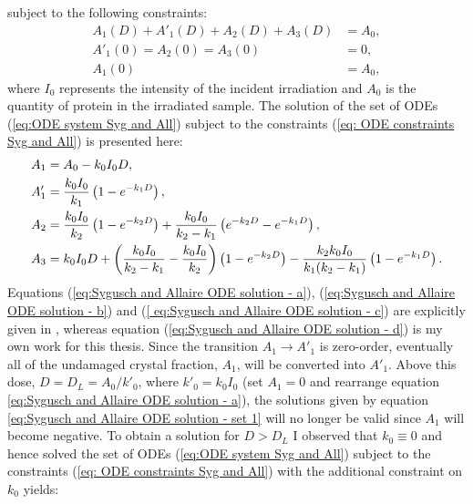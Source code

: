 subject to the following constraints:
\begin{subequations}
\begin{align}
A_1(D) + A'_1(D) + A_2(D) + A_3(D) &= A_0, \\
A'_1(0) = A_2(0) = A_3(0)          &= 0,   \\
A_1(0)                             &= A_0,
\end{align}
\label{eq: ODE constraints Syg and All}
\end{subequations}
where $I_0$ represents the intensity of the incident irradiation and $A_0$ is the quantity of protein in the irradiated sample.
\newline
The solution of the set of ODEs (\ref{eq:ODE system Syg and All}) subject to the constraints (\ref{eq: ODE constraints Syg and All}) is presented here:
\begin{subequations}
\begin{align}
A_1  &= A_0 - k_0 I_0 D, \label{eq:Sygusch and Allaire ODE solution - a}\\
A'_1 &= \frac{k_0 I_0}{k_1} \left( 1 - e^{-k_1 D}\right), \label{eq:Sygusch and Allaire ODE solution - b}\\
A_2  &= \frac{k_0 I_0}{k_2} \left( 1 - e^{-k_2 D}\right) + \frac{k_0 I_0}{k_2 - k_1} \left(e^{-k_2 D} - e^{-k_1 D}\right), \label{
eq:Sygusch and Allaire ODE solution - c}\\
A_3  &= k_0 I_0 D + \left(\frac{k_0 I_0}{k_2 - k_1} - \frac{k_0 I_0}{k_2}\right)\left( 1 - e^{-k_2 D}\right) - \frac{k_2 k_0 I_0}{k_1(k_2 - k_1)}\left(1 - e^{-k_1 D} \right) \label{eq:Sygusch and Allaire ODE solution - d}.
\end{align}
\label{eq:Sygusch and Allaire ODE solution - set 1}
\end{subequations}
Equations (\ref{eq:Sygusch and Allaire ODE solution - a}), (\ref{eq:Sygusch and Allaire ODE solution - b}) and (\ref{
eq:Sygusch and Allaire ODE solution - c}) are explicitly given in \cite{sygusch1988}, whereas equation (\ref{eq:Sygusch and Allaire ODE solution - d}) is my own work for this thesis.
Since the transition $A_1 \rightarrow A'_1$ is zero-order, eventually all of the undamaged crystal fraction, $A_1$, will be converted into $A'_1$.
Above this dose, $D = D_L = A_0/k'_0$, where $k'_0 = k_0 I_0$ (set $A_1 = 0$ and rearrange equation \ref{eq:Sygusch and Allaire ODE solution - a}), the solutions given by equation \ref{eq:Sygusch and Allaire ODE solution - set 1} will no longer be valid since $A_1$ will become negative.
To obtain a solution for $D > D_L$ I observed that $k_0 \equiv 0$ and hence solved the set of ODEs (\ref{eq:ODE system Syg and All}) subject to the constraints (\ref{eq: ODE constraints Syg and All}) with the additional constraint on $k_0$ yields:
